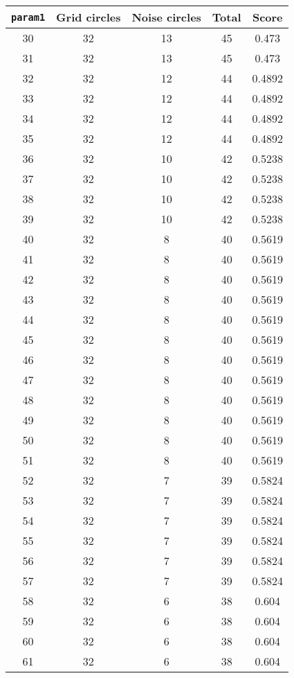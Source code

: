 \documentclass[letterpaper, 12pt]{article}
\begin{document}
\begin{longtable}{|c|c|c|c|c|}
\hline
\textbf{\texttt{param1}} & \textbf{Grid circles} & \textbf{Noise circles} & \textbf{Total} & \textbf{Score} \\
\hline
30 & 32 & 13 & 45 & 0.473 \\
\hline
31 & 32 & 13 & 45 & 0.473 \\
\hline
32 & 32 & 12 & 44 & 0.4892 \\
\hline
33 & 32 & 12 & 44 & 0.4892 \\
\hline
34 & 32 & 12 & 44 & 0.4892 \\
\hline
35 & 32 & 12 & 44 & 0.4892 \\
\hline
36 & 32 & 10 & 42 & 0.5238 \\
\hline
37 & 32 & 10 & 42 & 0.5238 \\
\hline
38 & 32 & 10 & 42 & 0.5238 \\
\hline
39 & 32 & 10 & 42 & 0.5238 \\
\hline
40 & 32 & 8 & 40 & 0.5619 \\
\hline
41 & 32 & 8 & 40 & 0.5619 \\
\hline
42 & 32 & 8 & 40 & 0.5619 \\
\hline
43 & 32 & 8 & 40 & 0.5619 \\
\hline
44 & 32 & 8 & 40 & 0.5619 \\
\hline
45 & 32 & 8 & 40 & 0.5619 \\
\hline
46 & 32 & 8 & 40 & 0.5619 \\
\hline
47 & 32 & 8 & 40 & 0.5619 \\
\hline
48 & 32 & 8 & 40 & 0.5619 \\
\hline
49 & 32 & 8 & 40 & 0.5619 \\
\hline
50 & 32 & 8 & 40 & 0.5619 \\
\hline
51 & 32 & 8 & 40 & 0.5619 \\
\hline
52 & 32 & 7 & 39 & 0.5824 \\
\hline
53 & 32 & 7 & 39 & 0.5824 \\
\hline
54 & 32 & 7 & 39 & 0.5824 \\
\hline
55 & 32 & 7 & 39 & 0.5824 \\
\hline
56 & 32 & 7 & 39 & 0.5824 \\
\hline
57 & 32 & 7 & 39 & 0.5824 \\
\hline
58 & 32 & 6 & 38 & 0.604 \\
\hline
59 & 32 & 6 & 38 & 0.604 \\
\hline
60 & 32 & 6 & 38 & 0.604 \\
\hline
61 & 32 & 6 & 38 & 0.604 \\

\end{longtable}
\end{document}
